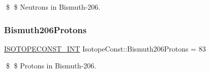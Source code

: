 \$ \$ Neutrons in Bismuth-\/206. \mbox{\label{group___isotope_const-_bismuth-_bi206_gaca7035d60652ba53af3c360c336fa1a3}} 
\subsubsection{\texorpdfstring{Bismuth206\+Protons}{Bismuth206Protons}}
{\footnotesize\ttfamily \mbox{\hyperlink{group___isotope_const-_macros_ga5f18360b3e99483a35c32d789e62621c}{I\+S\+O\+T\+O\+P\+E\+C\+O\+N\+S\+T\+\_\+\+I\+NT}} Isotope\+Const\+::\+Bismuth206\+Protons = 83}

\$ \$ Protons in Bismuth-\/206. 